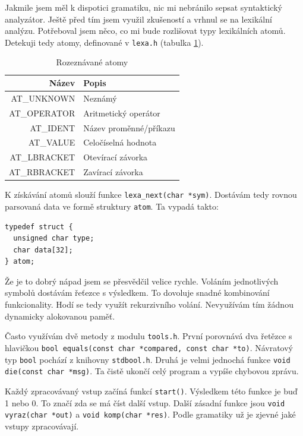 \documentclass{article}
\begin{document}
Jakmile jsem měl k dispotici gramatiku, nic mi nebránilo sepsat
syntaktický analyzátor. Ještě před tím jsem využil zkušeností a vrhnul
se na lexikální analýzu.  Potřeboval jsem něco, co mi bude rozlišovat
typy lexikálních atomů. Detekuji tedy atomy, definované v
\texttt{lexa.h} (tabulka \ref{tab:atom}).

\begin{table}
\centering
\begin{tabular}{|r|l|}
\hline
Název & Popis\\ \hline\hline
AT\_UNKNOWN & Neznámý\\ \hline
AT\_OPERATOR & Aritmetický operátor\\ \hline
AT\_IDENT & Název proměnné/příkazu\\ \hline
AT\_VALUE & Celočíselná hodnota\\ \hline
AT\_LBRACKET & Otevírací závorka\\ \hline
AT\_RBRACKET & Zavírací závorka\\
\hline
\end{tabular}
\caption{Rozeznávané atomy}
\label{tab:atom}
\end{table}

K získávání atomů slouží funkce \verb+lexa_next(char *sym)+.  Dostávám
tedy rovnou parsovaná data ve formě struktury \texttt{atom}.  Ta
vypadá takto: \lstset{language=C}
\begin{lstlisting}
typedef struct {
  unsigned char type;
  char data[32];
} atom;
\end{lstlisting}

Že je to dobrý nápad jsem se přesvědčil velice rychle. Voláním
jednotlivých symbolů dostávám řeťezce s výsledkem. To dovoluje
snadné kombinování funkcionality. Hodí se tedy využít rekurzivního
volání. Nevyužívám tím žádnou dynamicky alokovanou paměť.

Často využívám dvě metody z modulu \texttt{tools.h}. První porovnává
dva řetězce s hlavičkou
\verb+bool equals(const char *compared, const char *to)+. Návratový
typ \texttt{bool} pochází z knihovny \texttt{stdbool.h}. Druhá je
velmi jednochá funkce \verb+void die(const char *msg)+. Ta čistě
ukončí celý program a vypíše chybovou zprávu.

Každý zpracovávaný vstup začíná funkcí \texttt{start()}.  Výsledkem
této funkce je buď 1 nebo 0. To značí zda se má číst další vstup.
Další zásadní funkce jsou \verb+void vyraz(char *out)+ a
\verb+void komp(char *res)+. Podle gramatiky už je zjevné jaké
vstupy zpracovávají.
\end{document}
